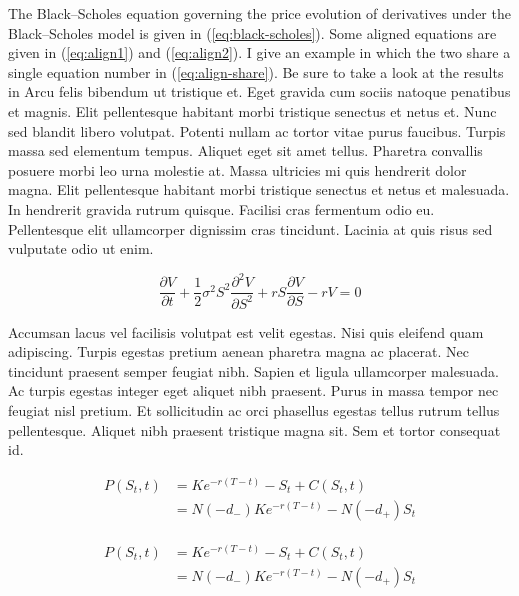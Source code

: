 The Black–Scholes equation governing the price evolution of derivatives under
the Black–Scholes model is given in (\ref{eq:black-scholes}). Some aligned
equations are given in (\ref{eq:align1}) and (\ref{eq:align2}). I give an
example in which the two share a single equation number in
(\ref{eq:align-share}). Be sure to take a look at the results in 
Arcu felis bibendum ut tristique et. Eget gravida
cum sociis natoque penatibus et magnis. Elit pellentesque habitant morbi
tristique senectus et netus et.
Nunc sed blandit libero volutpat.
Potenti nullam ac tortor vitae purus faucibus. Turpis massa sed elementum
tempus. Aliquet eget sit amet tellus. Pharetra convallis posuere morbi leo
urna molestie at. Massa ultricies mi quis hendrerit dolor magna. Elit
pellentesque habitant morbi tristique senectus et netus et malesuada. In
hendrerit gravida rutrum quisque. Facilisi cras fermentum odio eu.
Pellentesque elit ullamcorper dignissim cras tincidunt. Lacinia at quis
risus sed vulputate odio ut enim. 

\begin{equation}
\frac{\partial V}{\partial t} + \frac{1}{2}\sigma^2 S^2 \frac{\partial^2 V}{\partial S^2} 
+ rS\frac{\partial V}{\partial S} - rV = 0
\label{eq:black-scholes}
\end{equation}

Accumsan lacus vel facilisis volutpat est velit egestas. Nisi quis eleifend
quam adipiscing. Turpis egestas pretium aenean pharetra magna ac placerat.
Nec tincidunt praesent semper feugiat nibh. Sapien et ligula ullamcorper
malesuada. Ac turpis egestas integer eget aliquet nibh praesent. Purus in
massa tempor nec feugiat nisl pretium. Et sollicitudin ac orci phasellus
egestas tellus rutrum tellus pellentesque. Aliquet nibh praesent tristique
magna sit. Sem et tortor consequat id.

\begin{align}
P(S_t, t) &= Ke^{-r(T - t)} - S_t + C(S_t, t)   \label{eq:align1}\\
          &= N(-d_-) Ke^{-r(T - t)} - N(-d_+) S_t \label{eq:align2}
\end{align}



%
%
\begin{align}
\begin{split}
P(S_t, t) &= Ke^{-r(T - t)} - S_t + C(S_t, t)   \\
          &= N(-d_-) Ke^{-r(T - t)} - N(-d_+) S_t 
\end{split}
\label{eq:align-share}
\end{align}




